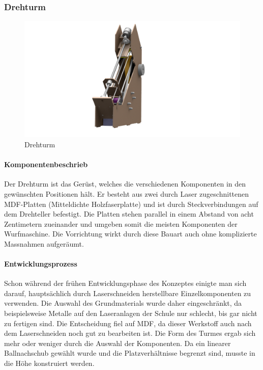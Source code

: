 \subsubsection{Drehturm}
\begin{figure}[h!]
	\centering
	\includegraphics[width=\linewidth]{../../fig/Drehturm}
	\caption{Drehturm}
	\label{fig:Drehturm}
\end{figure}

\paragraph{Komponentenbeschrieb}

Der Drehturm ist das Gerüst, welches die verschiedenen Komponenten in den gewünschten Positionen hält. Er besteht aus zwei durch Laser zugeschnittenen MDF-Platten (Mitteldichte Holzfaserplatte) und ist durch Steckverbindungen auf dem Drehteller befestigt. Die Platten stehen parallel in einem Abstand von acht Zentimetern zueinander und umgeben somit die meisten Komponenten der Wurfmaschine. Die Vorrichtung wirkt durch diese Bauart auch ohne komplizierte Massnahmen aufgeräumt.

\paragraph{Entwicklungsprozess}

Schon während der frühen Entwicklungsphase des Konzeptes einigte man sich darauf, hauptsächlich durch Laserschneiden herstellbare Einzelkomponenten zu verwenden. Die Auswahl des Grundmaterials wurde daher eingeschränkt, da beispielsweise Metalle auf den Laseranlagen der Schule nur schlecht, bis gar nicht zu fertigen sind. Die Entscheidung fiel auf MDF, da dieser Werkstoff auch nach dem Laserschneiden noch gut zu bearbeiten ist. Die Form des Turmes ergab sich mehr oder weniger durch die Auswahl der Komponenten. Da ein linearer Ballnachschub gewählt wurde und die Platzverhältnisse begrenzt sind, musste in die Höhe konstruiert werden.